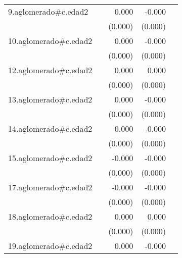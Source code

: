 {\begin{longtable}{l*{4}{D{.}{.}{-1}}}
\addlinespace
9.aglomerado#c.edad2&                     &       0.000         &      -0.000\sym{*}  &                     \\
            &                     &     (0.000)         &     (0.000)         &                     \\
\addlinespace
10.aglomerado#c.edad2&                     &       0.000         &      -0.000         &                     \\
            &                     &     (0.000)         &     (0.000)         &                     \\
\addlinespace
12.aglomerado#c.edad2&                     &       0.000\sym{*}  &       0.000         &                     \\
            &                     &     (0.000)         &     (0.000)         &                     \\
\addlinespace
13.aglomerado#c.edad2&                     &       0.000         &      -0.000         &                     \\
            &                     &     (0.000)         &     (0.000)         &                     \\
\addlinespace
14.aglomerado#c.edad2&                     &       0.000         &      -0.000         &                     \\
            &                     &     (0.000)         &     (0.000)         &                     \\
\addlinespace
15.aglomerado#c.edad2&                     &      -0.000         &      -0.000         &                     \\
            &                     &     (0.000)         &     (0.000)         &                     \\
\addlinespace
17.aglomerado#c.edad2&                     &      -0.000         &      -0.000\sym{*}  &                     \\
            &                     &     (0.000)         &     (0.000)         &                     \\
\addlinespace
18.aglomerado#c.edad2&                     &       0.000\sym{*}  &       0.000         &                     \\
            &                     &     (0.000)         &     (0.000)         &                     \\
\addlinespace
19.aglomerado#c.edad2&                     &       0.000         &      -0.000         &                     \\

\end{longtable}}
